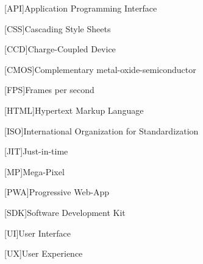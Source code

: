 \begin{acronym}[AAAAA]

[API]{Application Programming Interface}

[CSS]{Cascading Style Sheets}

[CCD]{Charge-Coupled Device}

[CMOS]{Complementary metal-oxide-semiconductor}

[FPS]{Frames per second}

[HTML]{Hypertext Markup Language}

[ISO]{International Organization for Standardization}

[JIT]{Just-in-time}

[MP]{Mega-Pixel}

[PWA]{Progressive Web-App}

[SDK]{Software Development Kit}

[UI]{User Interface}

[UX]{User Experience}

\end{acronym}